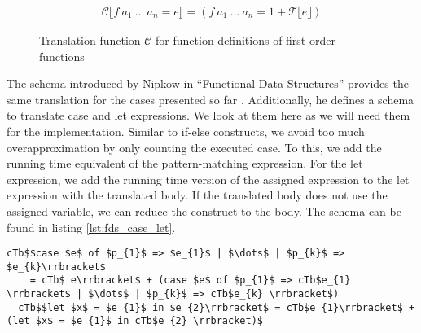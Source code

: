 \begin{figure}
\begin{align*}
    \mathcal{C}\llbracket f\ a_{1}\ \dots\ a_{n} = e\rrbracket = (f\ a_{1}\ \dots\ a_{n} = 1 + \mathcal{T}\llbracket e \rrbracket)
\end{align*}
\caption{Translation function $\mathcal{C}$ for function definitions of first-order functions}
\label{fig:first_order_C}
\end{figure}

The schema introduced by Nipkow in ``Functional Data Structures'' provides the same translation for the cases presented so far \parencite{fds}.
Additionally, he defines a schema to translate case and let expressions.
We look at them here as we will need them for the implementation.
Similar to if-else constructs, we avoid too much overapproximation by only counting the executed case.
To this, we add the running time equivalent of the pattern-matching expression.
For the let expression, we add the running time version of the assigned expression to the let expression with the translated body.
If the translated body does not use the assigned variable, we can reduce the construct to the body.
The schema can be found in listing \ref{lst:fds_case_let}.
\begin{lstlisting}[language=translation,label=lst:fds_case_let,caption=Translation schema for case- and let-expression by Nipkow,mathescape=true]
  cTb$$case $e$ of $p_{1}$ => $e_{1}$ | $\dots$ | $p_{k}$ => $e_{k}\rrbracket$
    = cTb$ e\rrbracket$ + (case $e$ of $p_{1}$ => cTb$e_{1} \rrbracket$ | $\dots$ | $p_{k}$ => cTb$e_{k} \rrbracket$)
  cTb$$let $x$ = $e_{1}$ in $e_{2}\rrbracket$ = cTb$e_{1}\rrbracket$ + (let $x$ = $e_{1}$ in cTb$e_{2} \rrbracket)$
\end{lstlisting}
